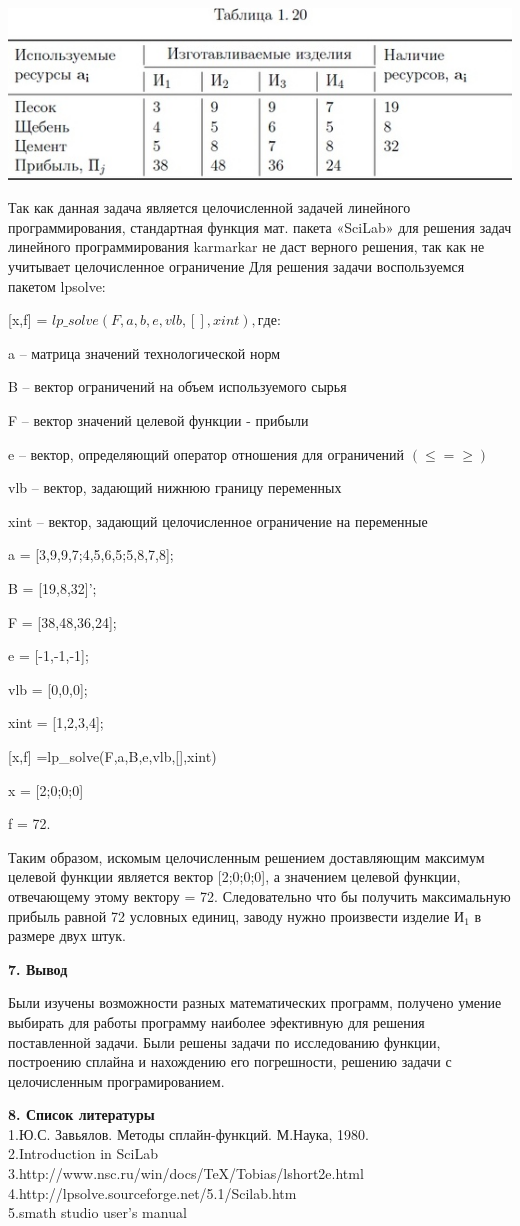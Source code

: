 \documentclass[russian,utf8,nocolumnxxxi,nocolumnxxxii]{eskdtext}
\begin{document}
\begin{center} 
\includegraphics[scale=0.7]{1} 
\end{center} 
Так как данная задача является целочисленной задачей линейного программирования, стандартная функция мат. пакета «SciLab» для решения задач линейного программирования karmarkar не даст верного решения, так как не учитывает целочисленное ограничение 
Для решения задачи воспользуемся пакетом lpsolve: 

[x,f] = $lp\_solve(F,a,b,e,vlb,[],xint), где:$ 

a – матрица значений технологической норм 

B – вектор ограничений на объем используемого сырья 

F – вектор значений целевой функции - прибыли 

e – вектор, определяющий оператор отношения для ограничений $(\leq = \geq)$ 

vlb – вектор, задающий нижнюю границу переменных 

xint – вектор, задающий целочисленное ограничение на переменные 


a = [3,9,9,7;4,5,6,5;5,8,7,8]; 

B = [19,8,32]’; 

F = [38,48,36,24]; 

e = [-1,-1,-1]; 

vlb = [0,0,0]; 

xint = [1,2,3,4]; 

[x,f] =lp\_solve(F,a,B,e,vlb,[],xint) 

x = [2;0;0;0] 

f = 72. 

Таким образом, искомым целочисленным решением доставляющим максимум целевой функции является вектор [2;0;0;0], а значением целевой функции, отвечающему этому вектору = 72. Следовательно что бы получить максимальную прибыль равной 72 условных единиц, заводу нужно произвести изделие И$_1$ в размере двух штук.

\newpage
\begin{center} {\bf7. Вывод} \end{center}
Были изучены возможности разных математических программ, получено умение выбирать для работы программу наиболее эфективную для решения поставленной задачи. Были решены задачи по исследованию функции, построению сплайна и нахождению его погрешности, решению задачи с целочисленным програмированием.



\newpage
{\bf8. Список литературы}
\\1.Ю.С. Завьялов. Методы сплайн-функций. М.Наука, 1980.
\\2.Introduction in SciLab
\\3.http://www.nsc.ru/win/docs/TeX/Tobias/lshort2e.html
\\4.http://lpsolve.sourceforge.net/5.1/Scilab.htm
\\5.smath studio user’s manual
\end{document}
